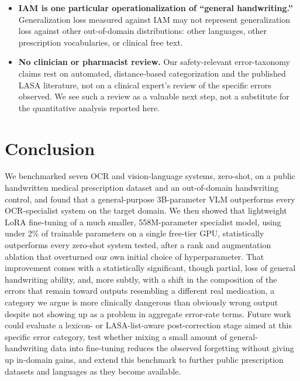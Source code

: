 \documentclass[12pt]{article}
\begin{document}
\begin{itemize}[leftmargin=*]
Table~\ref{tab:errortax}) is one value within that range rather than a uniquely determined one; we did not
re-run the equivalent sweep for the zero-shot model, so this check supports the category's existence being
robust to the exact cutoff, not that the specific zero-shot-versus-fine-tuned shift in
Table~\ref{tab:errortax} is itself threshold-invariant. We therefore report 0.34 as a transparent, reasonable
design choice supported by a robustness check, not as a precisely justified cutoff; a formal LASA-pair-based
definition, following Karet \citep{Karet2023TallMan}, would be a natural refinement.
\item \textbf{IAM is one particular operationalization of ``general handwriting.''} Generalization loss
measured against IAM may not represent generalization loss against other out-of-domain distributions:
other languages, other prescription vocabularies, or clinical free text.
\item \textbf{No clinician or pharmacist review.} Our safety-relevant error-taxonomy claims rest on
automated, distance-based categorization and the published LASA literature, not on a clinical expert's
review of the specific errors observed. We see such a review as a valuable next step, not a substitute for
the quantitative analysis reported here.
\end{itemize}

\section{Conclusion}

We benchmarked seven OCR and vision-language systems, zero-shot, on a public handwritten medical
prescription dataset and an out-of-domain handwriting control, and found that a general-purpose
3B-parameter VLM outperforms every OCR-specialist system on the target domain. We then showed that
lightweight LoRA fine-tuning of a much smaller, 558M-parameter specialist model, using under 2\% of
trainable parameters on a single free-tier GPU, statistically outperforms every zero-shot system tested,
after a rank and augmentation ablation that overturned our own initial choice of hyperparameter. That
improvement comes with a statistically significant, though partial, loss of general handwriting ability,
and, more subtly, with a shift in the composition of the errors that remain toward outputs resembling a
different real medication, a category we argue is more clinically dangerous than obviously wrong output
despite not showing up as a problem in aggregate error-rate terms. Future work could evaluate a lexicon- or
LASA-list-aware post-correction stage aimed at this specific error category, test whether mixing a small
amount of general-handwriting data into fine-tuning reduces the observed forgetting without giving up
in-domain gains, and extend this benchmark to further public prescription datasets and languages as they
become available.
\end{document}
